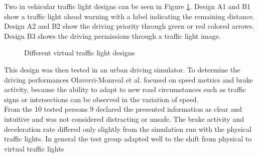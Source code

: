 \documentclass{sig-alternate}
\begin{document}
Two in vehicular traffic light designs can be seen in Figure \ref{fig:trafficlight1}. Design A1 and B1 show a traffic light ahead warning with a label indicating the remaining distance. Design A2 and B2 show the driving priority through green or red colored arrows. Design B3 shows the driving permissions through a traffic light image. 
\begin{figure} 
\centering
{}
\caption{Different virtual traffic light designs}
\label{fig:trafficlight1}
\end{figure}
This design was then tested in an urban driving simulator. To determine the driving performances Olaverri-Monreal et al. focused on speed metrics and brake activity, because the ability to adapt to new road circumstances such as traffic signs or intersections can be observed in the variation of speed. \\ From the 10 tested persons 9 declared the presented information as clear and intuitive and was not considered distracting or unsafe. The brake activity and deceleration rate differed only slightly from the simulation run with the physical traffic lights. In general the test group adapted well to the shift from physical to virtual traffic lights\\
\end{document}
